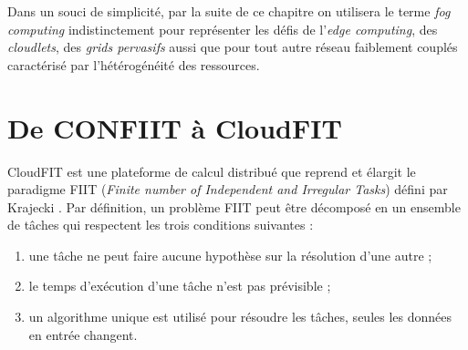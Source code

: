 Dans un souci de simplicité, par la suite de ce chapitre on utilisera le terme \textit{fog computing} indistinctement pour représenter les défis de l'\textit{edge computing}, des \textit{cloudlets}, des \textit{grids pervasifs} aussi que pour tout autre réseau faiblement couplés caractérisé par l'hétérogénéité des ressources.
 


\section{De CONFIIT à CloudFIT}

CloudFIT est une plateforme de calcul distribué que reprend et élargit le paradigme FIIT (\textit{Finite number of Independent and Irregular Tasks}) défini par Krajecki \cite{Kraj99}. Par définition, un problème FIIT peut être décomposé en un ensemble de tâches qui respectent les trois conditions suivantes :
\begin{enumerate}
	\item une tâche ne peut faire aucune hypothèse sur la résolution d'une autre ;
	\item le temps d'exécution d'une tâche n'est pas prévisible ;
	\item un algorithme unique est utilisé pour résoudre les tâches, seules les données en entrée changent. 
\end{enumerate}

